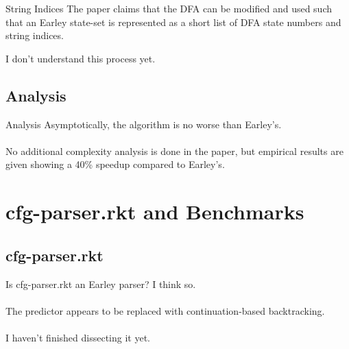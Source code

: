 \documentclass{beamer}
\begin{document}
\begin{frame}{String Indices}
  The paper claims that the DFA can be modified and used such that an Earley state-set is represented as a short list of DFA state numbers and string indices.

  I don't understand this process yet.
\end{frame}

\subsection{Analysis}
\begin{frame}{Analysis}
  Asymptotically, the algorithm is no worse than Earley's.\\~\\

  No additional complexity analysis is done in the paper, but empirical results are given showing a 40\% speedup compared to Earley's.
\end{frame}

\section{cfg-parser.rkt and Benchmarks}
\subsection{cfg-parser.rkt}
\begin{frame}{Is cfg-parser.rkt an Earley parser?}
  I think so.\\~\\

  The predictor appears to be replaced with continuation-based backtracking.\\~\\

  I haven't finished dissecting it yet.
\end{frame}
\end{document}
